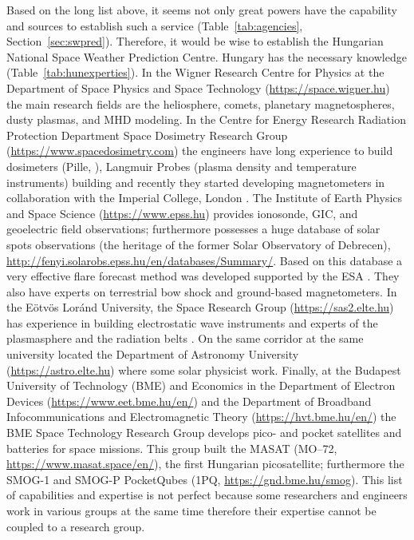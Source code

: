 \documentclass[sn-aps]{sn-jnl}%
\begin{document}
Based on the long list above, it seems not only great powers have the capability and sources to establish such a service (Table~\ref{tab:agencies}, Section~\ref{sec:swpred}). Therefore, it would be wise to establish the Hungarian National Space Weather Prediction Centre. Hungary has the necessary knowledge (Table~\ref{tab:hunexperties}). In the Wigner Research Centre for Physics at the Department of Space Physics and Space Technology (\url{https://space.wigner.hu}) the main research fields are the heliosphere, comets, planetary magnetospheres, dusty plasmas, and MHD modeling. In the Centre for Energy Research Radiation Protection Department Space Dosimetry Research Group (\url{https://www.spacedosimetry.com}) the engineers have long experience to build dosimeters (Pille, \cite{apathy02:_dose_hungar_pille_tld}), Langmuir Probes (plasma density and temperature instruments) building and recently they started developing magnetometers in collaboration with the Imperial College, London \cite{hirn22:_charac_radmag_radcub_iod}. The Institute of Earth Physics and Space Science (\url{https://www.epss.hu}) provides ionosonde, GIC, and geoelectric field observations; furthermore possesses a huge database of solar spots observations (the heritage of the former Solar Observatory of Debrecen), \url{http://fenyi.solarobs.epss.hu/en/databases/Summary/}. Based on this database a very effective flare forecast method was developed supported by the ESA \cite{korsos14:_pre_dynam_sunsp_group,korsos15:_dynam_precur_flares_activ_region_noaa}. They also have experts on terrestrial bow shock and ground-based magnetometers. In the E{\"o}tv{\"o}s Lor{\'a}nd University, the Space Research Group (\url{https://sas2.elte.hu}) has experience in building electrostatic wave instruments and experts of the plasmasphere and the radiation belts \cite{lichtenberger08:_autom_whist_detec_analy,lichtenberger13}. On the same corridor at the same university located the Department of Astronomy University (\url{https://astro.elte.hu}) where some solar physicist work. Finally, at the Budapest University of Technology (BME) and Economics in the Department of Electron Devices (\url{https://www.eet.bme.hu/en/}) and the Department of Broadband Infocommunications and Electromagnetic Theory (\url{https://hvt.bme.hu/en/}) the BME Space Technology Research Group develops pico- and pocket satellites and batteries for space missions. This group built the MASAT (MO--72, \url{https://www.masat.space/en/}), the first Hungarian picosatellite; furthermore the SMOG-1 and SMOG-P PocketQubes (1PQ, \url{https://gnd.bme.hu/smog}). This list of capabilities and expertise is not perfect because some researchers and engineers work in various groups at the same time therefore their expertise cannot be coupled to a research group.
\end{document}
